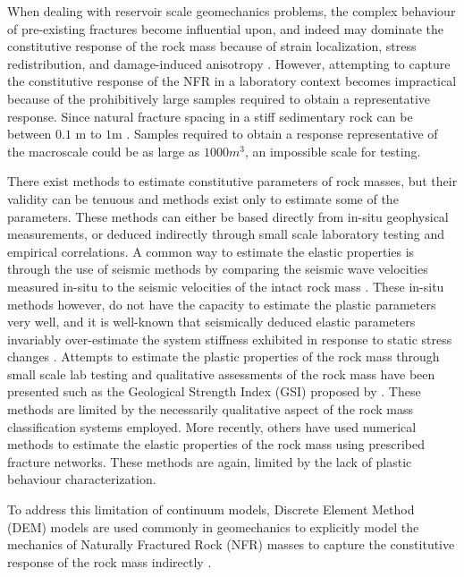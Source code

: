 When dealing with reservoir scale geomechanics problems, the complex behaviour of pre-existing fractures become influential upon, and indeed may dominate the constitutive response of the rock mass because of strain localization, stress redistribution, and damage-induced anisotropy \citep{Petracca_2015}. However, attempting to capture the constitutive response of the NFR in a laboratory context becomes impractical because of the prohibitively large samples required to obtain a representative response. Since natural fracture spacing in a stiff sedimentary rock can be between $0.1$ m to $1$m \citep{Nelson_2001}. Samples required to obtain a response representative of the macroscale could be as large as $1000 m^3$, an impossible scale for testing. 

There exist methods to estimate constitutive parameters of rock masses, but their validity can be tenuous and methods exist only to estimate some of the parameters. These methods can either be based directly from in-situ geophysical measurements, or deduced indirectly through small scale laboratory testing and empirical correlations. A common way to estimate the elastic properties is through the use of seismic methods by comparing the seismic wave velocities measured in-situ to the seismic velocities of the intact rock mass \citep{SJOGREN_1979}. These in-situ methods however, do not have the capacity to estimate the plastic parameters very well, and it is well-known that seismically deduced elastic parameters invariably over-estimate the system stiffness exhibited in response to static stress changes \cite{Barton_2006}. Attempts to estimate the plastic properties of the rock mass through small scale lab testing and qualitative assessments of the rock mass have been presented such as the Geological Strength Index (GSI) proposed by \citet{Hoek_1997}. These methods are limited by the necessarily qualitative aspect of the rock mass classification systems employed. More recently, others \citep{Min_2003,Chen_2012,Bidgoli_2013} have used numerical methods to estimate the elastic properties of the rock mass using prescribed fracture networks. These methods are again, limited by the lack of plastic behaviour characterization. 

To address this limitation of continuum models, Discrete Element Method (DEM) models are used commonly in geomechanics to explicitly model the mechanics of Naturally Fractured Rock (NFR) masses to capture the constitutive response of the rock mass indirectly \citep{jing_review_2003}. 

